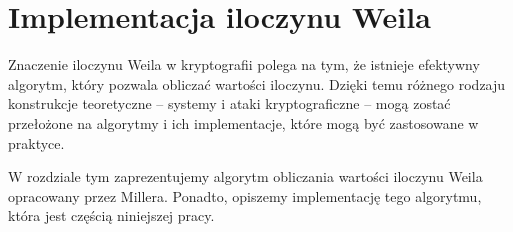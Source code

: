 \chapter{Implementacja iloczynu Weila}

\noindent
Znaczenie iloczynu Weila w kryptografii polega na tym,
że istnieje efektywny algorytm,
który pozwala obliczać wartości iloczynu.
Dzięki temu różnego rodzaju konstrukcje teoretyczne --
systemy i ataki kryptograficzne --
mogą zostać przełożone na algorytmy i ich implementacje,
które mogą być zastosowane w praktyce.

\noindent
W rozdziale tym zaprezentujemy algorytm obliczania wartości iloczynu Weila
opracowany przez Millera.
Ponadto, opiszemy implementację tego algorytmu,
która jest częścią niniejszej pracy.








